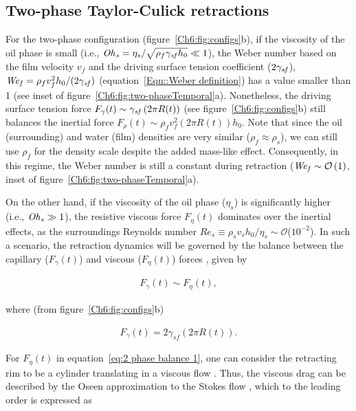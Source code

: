 \subsection{Two-phase Taylor-Culick retractions}\label{sec:2-phase forces}
For the two-phase configuration (figure~\ref{Ch6:fig:configs}b), if the viscosity of the oil phase is small (i.e., $\mathit{Oh}_\mathit{s} = \eta_s/\sqrt{\rho_f\gamma_\mathit{sf} h_0} \ll 1$), the Weber number based on the film velocity $v_f$ and the driving surface tension coefficient ($2\gamma_\mathit{sf}$), $\mathit{We}_\mathit{f} = \rho_fv_f^2h_0/(2\gamma_\mathit{sf})$ (equation~\eqref{Eqn::Weber definition}) has a value smaller than 1 (see inset of figure~\ref{Ch6:fig:two-phaseTemporal}a). Nonetheless, the driving surface tension force $F_\gamma(t) \sim \gamma_\mathit{sf}\left(2\pi R(t)\right)$ (see figure~\ref{Ch6:fig:configs}b) still balances the inertial force $F_\rho(t) \sim \rho_f v_f^2\left(2\pi R(t)\right)h_0$. Note that since the oil (surrounding) and water (film) densities are very similar ($\rho_f \approx \rho_s$), we can still use $\rho_f$ for the density scale despite the added mass-like effect. Consequently, in this regime, the Weber number is still a constant during retraction ($\mathit{We}_\mathit{f} \sim \mathcal{O}\left(1\right)$,  inset of figure~\ref{Ch6:fig:two-phaseTemporal}a). 

On the other hand, if the viscosity of the oil phase ($\eta_s$) is significantly higher (i.e., $\mathit{Oh}_\mathit{s} \gg 1$), the resistive viscous force $F_{\eta}(t)$ dominates over the inertial effects, as the surroundings Reynolds number $Re_s \equiv \rho_s v_s h_0/\eta_s \sim \mathcal{O}$($10^{-2}$). In such a scenario, the retraction dynamics will be governed by the balance between the capillary ($F_{\gamma}(t)$) and viscous ($F_{\eta}(t)$) forces \citep{fraaije-1989-jcis, reddy-2020-prf}, given by

\begin{align}
	F_{\gamma}(t) \sim F_{\eta}(t),
	\label{eq:2 phase balance 1}
\end{align}

\noindent where (from figure~\ref{Ch6:fig:configs}b)

\begin{align}
	F_\gamma(t) = 2 \gamma_{sf}\left(2\pi R(t)\right).
	\label{eq:2 phase gamma}
\end{align}

For $F_{\eta}(t)$ in equation~\eqref{eq:2 phase balance 1}, one can consider the retracting rim to be a cylinder translating in a viscous flow \citep{reyssat-2006-epl, eri-2010-pre}. Thus, the viscous drag can be described by the Oseen approximation to the Stokes flow \citep{book-lamb, book-happel}, which to the leading order is expressed as

